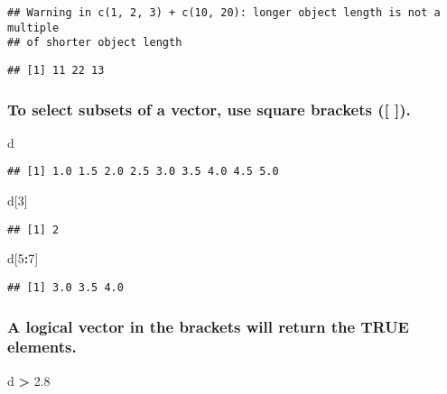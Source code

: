 \documentclass[]{article}
\newenvironment{Shaded}{\begin{snugshade}}{\end{snugshade}}
\newcommand{\DecValTok}[1]{\textcolor[rgb]{0.00,0.00,0.81}{#1}}
\newcommand{\FloatTok}[1]{\textcolor[rgb]{0.00,0.00,0.81}{#1}}
\newcommand{\StringTok}[1]{\textcolor[rgb]{0.31,0.60,0.02}{#1}}
\newcommand{\OperatorTok}[1]{\textcolor[rgb]{0.81,0.36,0.00}{\textbf{#1}}}
\newcommand{\NormalTok}[1]{#1}
\begin{document}
\begin{verbatim}
## Warning in c(1, 2, 3) + c(10, 20): longer object length is not a multiple
## of shorter object length
\end{verbatim}

\begin{verbatim}
## [1] 11 22 13
\end{verbatim}

\subsubsection{To select subsets of a vector, use square brackets ({[}
{]}).}\label{to-select-subsets-of-a-vector-use-square-brackets-.}

\begin{Shaded}
\begin{Highlighting}[]
\NormalTok{d}
\end{Highlighting}
\end{Shaded}

\begin{verbatim}
## [1] 1.0 1.5 2.0 2.5 3.0 3.5 4.0 4.5 5.0
\end{verbatim}

\begin{Shaded}
\begin{Highlighting}[]
\NormalTok{d[}\DecValTok{3}\NormalTok{]}
\end{Highlighting}
\end{Shaded}

\begin{verbatim}
## [1] 2
\end{verbatim}

\begin{Shaded}
\begin{Highlighting}[]
\NormalTok{d[}\DecValTok{5}\OperatorTok{:}\DecValTok{7}\NormalTok{]}
\end{Highlighting}
\end{Shaded}

\begin{verbatim}
## [1] 3.0 3.5 4.0
\end{verbatim}

\subsubsection{A logical vector in the brackets will return the TRUE
elements.}\label{a-logical-vector-in-the-brackets-will-return-the-true-elements.}

\begin{Shaded}
\begin{Highlighting}[]
\NormalTok{d }\OperatorTok{>}\StringTok{ }\FloatTok{2.8}
\end{Highlighting}
\end{Shaded}
\end{document}
